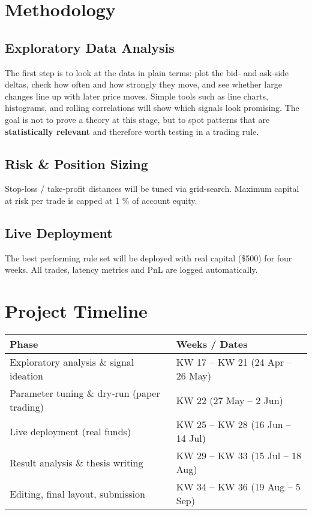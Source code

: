 \documentclass[a4paper,12pt]{article}
\begin{document}
\section{Methodology}

\subsection{Exploratory Data Analysis}

The first step is to look at the data in plain terms: plot the bid‑ and
ask‑side deltas, check how often and how strongly they move, and see
whether large changes line up with later price moves.  Simple tools
such as line charts, histograms, and rolling correlations will show
which signals look promising.  The goal is not to prove a theory at
this stage, but to spot patterns that are \textbf{statistically
relevant} and therefore worth testing in a trading rule.



\subsection{Risk \& Position Sizing}

Stop‑loss / take‑profit distances will be tuned via grid‑search.
Maximum capital at risk per trade is capped at 1 \% of account equity.

\subsection{Live Deployment}

The best performing rule set will be deployed with real capital
(\$500) for four weeks. All trades, latency metrics and
PnL are logged automatically.

\section{Project Timeline}

\begin{tabular}{ll}
\toprule
\textbf{Phase} & \textbf{Weeks / Dates} \\
\midrule
Exploratory analysis \& signal ideation      & KW 17 – KW 21 (24 Apr – 26 May) \\
Parameter tuning \& dry‑run (paper trading)  & KW 22 (27 May – 2 Jun) \\
Live deployment (real funds)                 & KW 25 – KW 28 (16 Jun – 14 Jul) \\
Result analysis \& thesis writing           & KW 29 – KW 33 (15 Jul – 18 Aug) \\
Editing, final layout, submission           & KW 34 – KW 36 (19 Aug – 5 Sep) \\
\bottomrule
\end{tabular}
\end{document}

